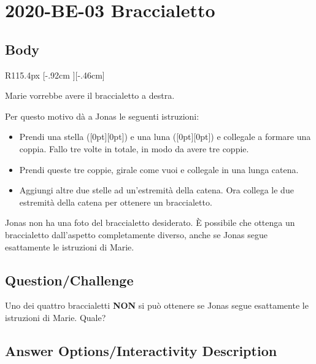 \documentclass[a4paper,11pt]{report}
\newcommand{\taskGraphicsFolder}{..}
\begin{document}
\section*{\centering{} 2020-BE-03 Braccialetto}


\subsection*{Body}

\begin{wrapfigure}{R}{115.4px}
\raisebox{-.46cm}[\dimexpr \height-.92cm \relax][-.46cm]{}
\end{wrapfigure}

Marie vorrebbe avere il braccialetto a destra.

Per questo motivo dà a Jonas le seguenti istruzioni:

\begin{itemize}
  \item Prendi una stella (\raisebox{-0.5ex}[0pt][0pt]{}) e una luna (\raisebox{-0.5ex}[0pt][0pt]{}) e collegale a formare una coppia. Fallo tre volte in totale, in modo da avere tre coppie.
  \item Prendi queste tre coppie, girale come vuoi e collegale in una lunga catena.
  \item Aggiungi altre due stelle ad un’estremità della catena. Ora collega le due estremità della catena per ottenere un braccialetto.
\end{itemize}

Jonas non ha una foto del braccialetto desiderato. È possibile che ottenga un braccialetto dall’aspetto completamente diverso, anche se Jonas segue esattamente le istruzioni di Marie.

{\em

\subsection*{Question/Challenge}

Uno dei quattro braccialetti \textbf{NON} si può ottenere se Jonas segue esattamente le istruzioni di Marie. Quale?

}\begingroup
\renewcommand{\arraystretch}{1.5}
\subsection*{Answer Options/Interactivity Description}
\end{document}
